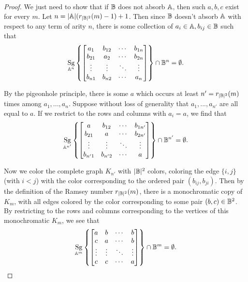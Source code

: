 \documentclass[letterpaper,11pt]{article}
\DeclareMathOperator{\Sg}{Sg}
\begin{document}
\begin{proof} We just need to show that if $\mathbb{B}$ does not absorb $\mathbb{A}$, then such $a,b,c$ exist for every $m$. Let $n = |\mathbb{A}|(r_{|\mathbb{B}|^2}(m)-1) + 1$. Then since $\mathbb{B}$ doesn't absorb $\mathbb{A}$ with respect to any term of arity $n$, there is some collection of $a_i \in \mathbb{A}, b_{ij} \in \mathbb{B}$ such that
\[
\Sg_{\bA^n}\left\{\begin{bmatrix} a_1 & b_{12} & \cdots & b_{1n}\\ b_{21} & a_2 & \cdots & b_{2n}\\ \vdots & \vdots & \ddots & \vdots\\ b_{n1} & b_{n2} & \cdots & a_n\end{bmatrix}\right\} \cap \bB^n = \emptyset.
\]

By the pigeonhole principle, there is some $a$ which occurs at least $n' = r_{|\mathbb{B}|^2}(m)$ times among $a_1, ..., a_n$. Suppose without loss of generality that $a_1, ..., a_{n'}$ are all equal to $a$. If we restrict to the rows and columns with $a_i = a$, we find that
\[
\Sg_{\bA^{n'}}\left\{\begin{bmatrix} a & b_{12} & \cdots & b_{1n'}\\ b_{21} & a & \cdots & b_{2n'}\\ \vdots & \vdots & \ddots & \vdots\\ b_{n'1} & b_{n'2} & \cdots & a\end{bmatrix}\right\} \cap \bB^{n'} = \emptyset.
\]

Now we color the complete graph $K_{n'}$ with $|\mathbb{B}|^2$ colors, coloring the edge $\{i,j\}$ (with $i < j$) with the color corresponding to the ordered pair $(b_{ij},b_{ji})$. Then by the definition of the Ramsey number $r_{|\mathbb{B}|^2}(m)$, there is a monochromatic copy of $K_m$, with all edges colored by the color corresponding to some pair $(b,c) \in \mathbb{B}^2$. By restricting to the rows and columns corresponding to the vertices of this monochromatic $K_m$, we see that
\[
\Sg_{\bA^{m}}\left\{\begin{bmatrix} a & b & \cdots & b\\ c & a & \cdots & b\\ \vdots & \vdots & \ddots & \vdots\\ c & c & \cdots & a\end{bmatrix}\right\} \cap \bB^{m} = \emptyset.\qedhere
\]
\end{proof}
\end{document}
